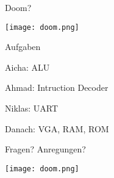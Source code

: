 

\begin{frame}{Doom?}
\begin{center}
\texttt{[image: doom.png]}
\end{center}
 

\end{frame}

\begin{frame}{Aufgaben}
\begin{itemization}
	\item Aicha: ALU
	\item Ahmad: Intruction Decoder
	\item Niklas: UART
	\item Danach: VGA, RAM, ROM
\end{itemization}	
\end{frame}

\begin{frame}{Fragen? Anregungen?} %
\begin{center}
\texttt{[image: doom.png]}
\end{center}
 


\end{frame}


